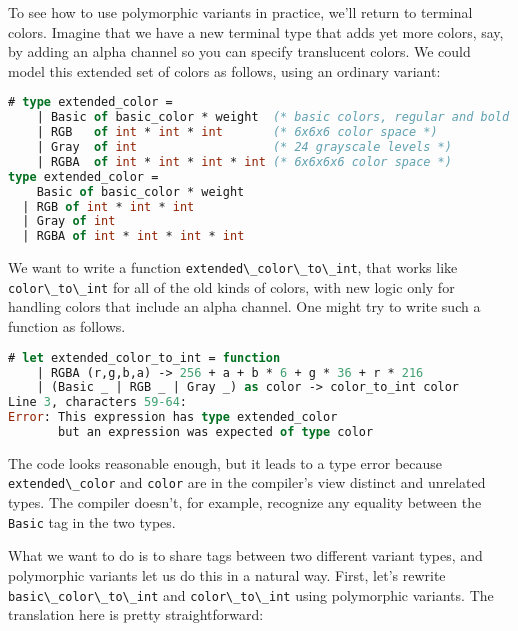 To see how to use polymorphic variants in practice, we'll return to
terminal colors. Imagine that we have a new terminal type that adds yet
more colors, say, by adding an alpha channel so you can specify
translucent colors. We could model this extended set of colors as
follows, using an ordinary
variant:

\begin{lstlisting}[language=Caml]
# type extended_color =
    | Basic of basic_color * weight  (* basic colors, regular and bold *)
    | RGB   of int * int * int       (* 6x6x6 color space *)
    | Gray  of int                   (* 24 grayscale levels *)
    | RGBA  of int * int * int * int (* 6x6x6x6 color space *)
type extended_color =
    Basic of basic_color * weight
  | RGB of int * int * int
  | Gray of int
  | RGBA of int * int * int * int
\end{lstlisting}

We want to write a function
\passthrough{\lstinline!extended\_color\_to\_int!}, that works like
\passthrough{\lstinline!color\_to\_int!} for all of the old kinds of
colors, with new logic only for handling colors that include an alpha
channel. One might try to write such a function as follows.

\begin{lstlisting}[language=Caml]
# let extended_color_to_int = function
    | RGBA (r,g,b,a) -> 256 + a + b * 6 + g * 36 + r * 216
    | (Basic _ | RGB _ | Gray _) as color -> color_to_int color
Line 3, characters 59-64:
Error: This expression has type extended_color
       but an expression was expected of type color
\end{lstlisting}

The code looks reasonable enough, but it leads to a type error because
\passthrough{\lstinline!extended\_color!} and
\passthrough{\lstinline!color!} are in the compiler's view distinct and
unrelated types. The compiler doesn't, for example, recognize any
equality between the \passthrough{\lstinline!Basic!} tag in the two
types.

What we want to do is to share tags between two different variant types,
and polymorphic variants let us do this in a natural way. First, let's
rewrite \passthrough{\lstinline!basic\_color\_to\_int!} and
\passthrough{\lstinline!color\_to\_int!} using polymorphic variants. The
translation here is pretty straightforward:

